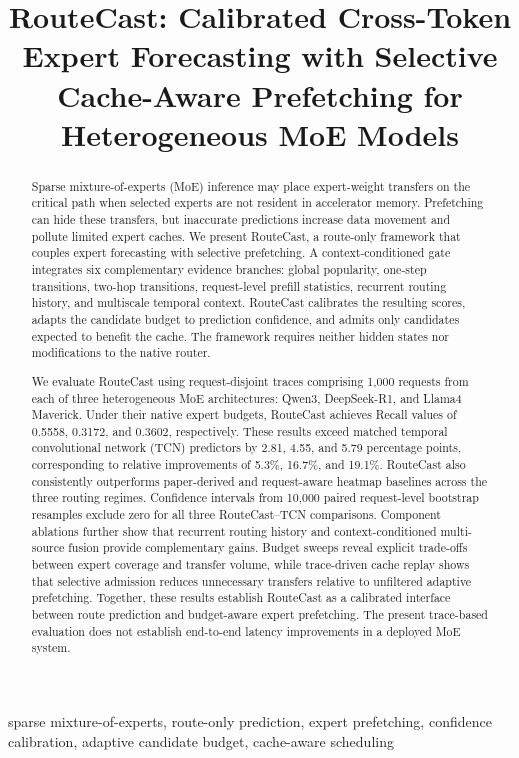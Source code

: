 \documentclass[conference]{IEEEtran}
\title{RouteCast: Calibrated Cross-Token Expert Forecasting with Selective Cache-Aware Prefetching for Heterogeneous MoE Models}
\author{\IEEEauthorblockN{Jihua Dong}
\IEEEauthorblockA{\textit{School of Microelectronics} \\
\textit{University of Electronic Science and Technology of China}\\
Chengdu, China \\
2023190903038@std.uestc.edu.cn}}
\begin{document}
\maketitle
\begin{abstract}
Sparse mixture-of-experts (MoE) inference may place expert-weight transfers on
the critical path when selected experts are not resident in accelerator memory.
Prefetching can hide these transfers, but inaccurate predictions increase data
movement and pollute limited expert caches. We present RouteCast, a route-only
framework that couples expert forecasting with selective prefetching. A
context-conditioned gate integrates six complementary evidence branches:
global popularity, one-step transitions, two-hop transitions, request-level
prefill statistics, recurrent routing history, and multiscale temporal
context. RouteCast calibrates the resulting scores, adapts the candidate
budget to prediction confidence, and admits only candidates expected to benefit
the cache. The framework requires neither hidden states nor modifications to
the native router.

We evaluate RouteCast using request-disjoint traces comprising 1,000 requests
from each of three heterogeneous MoE architectures: Qwen3, DeepSeek-R1, and
Llama4 Maverick. Under their native expert budgets, RouteCast achieves Recall
values of 0.5558, 0.3172, and 0.3602, respectively. These results exceed
matched temporal convolutional network (TCN) predictors by 2.81, 4.55, and
5.79 percentage points, corresponding to relative improvements of 5.3\%,
16.7\%, and 19.1\%. RouteCast also consistently outperforms paper-derived and
request-aware heatmap baselines across the three routing regimes. Confidence
intervals from 10,000 paired request-level bootstrap resamples exclude zero
for all three RouteCast--TCN comparisons. Component ablations further show
that recurrent routing history and context-conditioned multi-source fusion
provide complementary gains. Budget sweeps reveal explicit trade-offs between
expert coverage and transfer volume, while trace-driven cache replay shows
that selective admission reduces unnecessary transfers relative to unfiltered
adaptive prefetching. Together, these results establish RouteCast as a
calibrated interface between route prediction and budget-aware expert
prefetching. The present trace-based evaluation does not establish
end-to-end latency improvements in a deployed MoE system.
\end{abstract}


\begin{IEEEkeywords}
sparse mixture-of-experts, route-only prediction, expert prefetching,
confidence calibration, adaptive candidate budget, cache-aware scheduling
\end{IEEEkeywords}
\end{document}
